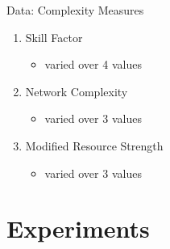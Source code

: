 \documentclass{beamer}
\begin{document}
\begin{frame}{Data: Complexity Measures}
	\begin{enumerate}
		\item Skill Factor
		\vspace{1mm}
		\begin{itemize}
			\item varied over 4 values\pause
		\end{itemize}
		\vspace{2mm}
		\item Network Complexity
		\vspace{1mm}
		\begin{itemize}
			\item varied over 3 values\pause
		\end{itemize}
		\vspace{2mm}
		\item Modified Resource Strength
		\vspace{1mm}
		\begin{itemize}
			\item varied over 3 values
		\end{itemize}
	\end{enumerate}
\end{frame}


\section{Experiments}
\end{document}
